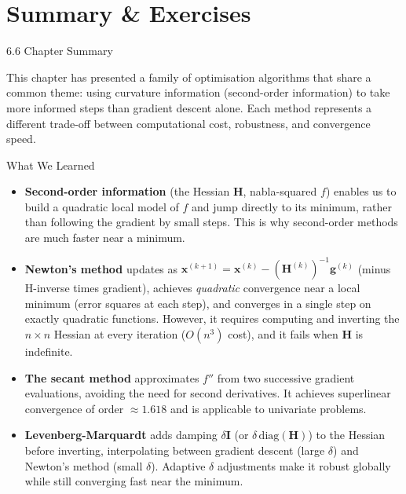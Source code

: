 \documentclass[aspectratio=169,10pt]{beamer}
\newcommand{\xbf}{\mathbf{x}}
\newcommand{\gbf}{\mathbf{g}}
\newcommand{\Hbf}{\mathbf{H}}
\newcommand{\Ibf}{\mathbf{I}}
\begin{document}
\section{Summary \& Exercises}

\begin{frame}[allowframebreaks]{6.6 Chapter Summary}

  This chapter has presented a family of optimisation algorithms that share a
  common theme: using curvature information (second-order information) to take
  more informed steps than gradient descent alone.  Each method represents a
  different trade-off between computational cost, robustness, and convergence
  speed.

  \begin{block}{What We Learned}
    \begin{itemize}
      \item \textbf{Second-order information} (the Hessian $\Hbf$, nabla-squared
        $f$) enables us to build a quadratic local model of $f$ and jump directly
        to its minimum, rather than following the gradient by small steps.  This
        is why second-order methods are much faster near a minimum.

      \item \textbf{Newton's method} updates as $\xbf^{(k+1)} = \xbf^{(k)} -
        (\Hbf^{(k)})^{-1}\gbf^{(k)}$ (minus H-inverse times gradient), achieves
        \emph{quadratic} convergence near a local minimum (error squares at each
        step), and converges in a single step on exactly quadratic functions.
        However, it requires computing and inverting the $n\times n$ Hessian at
        every iteration ($O(n^3)$ cost), and it fails when $\Hbf$ is indefinite.

      \item \textbf{The secant method} approximates $f''$ from two successive
        gradient evaluations, avoiding the need for second derivatives.  It
        achieves superlinear convergence of order $\approx 1.618$ and is
        applicable to univariate problems.

      \item \textbf{Levenberg-Marquardt} adds damping $\delta\Ibf$ (or
        $\delta\,\mathrm{diag}(\Hbf)$) to the Hessian before inverting,
        interpolating between gradient descent (large $\delta$) and Newton's
        method (small $\delta$).  Adaptive $\delta$ adjustments make it robust
        globally while still converging fast near the minimum.


\end{itemize}
\end{block}
\end{frame}
\end{document}

